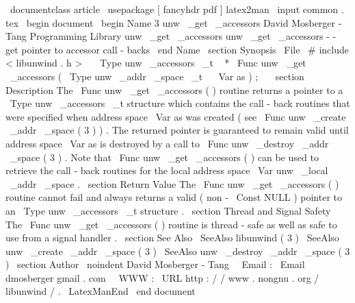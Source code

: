 \
documentclass
{
article
}
\
usepackage
[
fancyhdr
pdf
]
{
latex2man
}
\
input
{
common
.
tex
}
\
begin
{
document
}
\
begin
{
Name
}
{
3
}
{
unw
\
_get
\
_accessors
}
{
David
Mosberger
-
Tang
}
{
Programming
Library
}
{
unw
\
_get
\
_accessors
}
unw
\
_get
\
_accessors
-
-
get
pointer
to
accessor
call
-
backs
\
end
{
Name
}
\
section
{
Synopsis
}
\
File
{
\
#
include
<
libunwind
.
h
>
}
\
\
\
Type
{
unw
\
_accessors
\
_t
~
*
}
\
Func
{
unw
\
_get
\
_accessors
}
(
\
Type
{
unw
\
_addr
\
_space
\
_t
~
}
\
Var
{
as
}
)
;
\
\
\
section
{
Description
}
The
\
Func
{
unw
\
_get
\
_accessors
}
(
)
routine
returns
a
pointer
to
a
\
Type
{
unw
\
_accessors
\
_t
}
structure
which
contains
the
call
-
back
routines
that
were
specified
when
address
space
\
Var
{
as
}
was
created
(
see
\
Func
{
unw
\
_create
\
_addr
\
_space
}
(
3
)
)
.
The
returned
pointer
is
guaranteed
to
remain
valid
until
address
space
\
Var
{
as
}
is
destroyed
by
a
call
to
\
Func
{
unw
\
_destroy
\
_addr
\
_space
}
(
3
)
.
Note
that
\
Func
{
unw
\
_get
\
_accessors
}
(
)
can
be
used
to
retrieve
the
call
-
back
routines
for
the
local
address
space
\
Var
{
unw
\
_local
\
_addr
\
_space
}
.
\
section
{
Return
Value
}
The
\
Func
{
unw
\
_get
\
_accessors
}
(
)
routine
cannot
fail
and
always
returns
a
valid
(
non
-
\
Const
{
NULL
}
)
pointer
to
an
\
Type
{
unw
\
_accessors
\
_t
}
structure
.
\
section
{
Thread
and
Signal
Safety
}
The
\
Func
{
unw
\
_get
\
_accessors
}
(
)
routine
is
thread
-
safe
as
well
as
safe
to
use
from
a
signal
handler
.
\
section
{
See
Also
}
\
SeeAlso
{
libunwind
(
3
)
}
\
SeeAlso
{
unw
\
_create
\
_addr
\
_space
(
3
)
}
\
SeeAlso
{
unw
\
_destroy
\
_addr
\
_space
(
3
)
}
\
section
{
Author
}
\
noindent
David
Mosberger
-
Tang
\
\
Email
:
\
Email
{
dmosberger
gmail
.
com
}
\
\
WWW
:
\
URL
{
http
:
/
/
www
.
nongnu
.
org
/
libunwind
/
}
.
\
LatexManEnd
\
end
{
document
}
